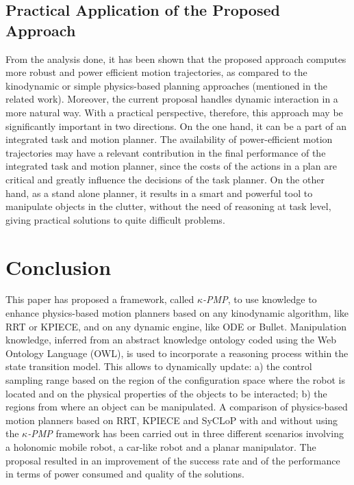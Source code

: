 \documentclass[twocolumn]{svjour3}          %
\begin{document}
\subsection{Practical Application of the Proposed Approach}
From the analysis done, it has been shown that the proposed approach computes more robust and power efficient motion trajectories, as compared to the kinodynamic or simple physics-based planning 
approaches (mentioned 
in the related work). Moreover, the current proposal handles dynamic interaction in a more natural way.  
With a practical perspective, therefore, this approach may be significantly important in two directions. On the one hand, it can be a part of an integrated task and motion planner. The availability of power-efficient motion trajectories may have a relevant contribution in the final performance of the integrated task and motion planner, since  the costs of the actions in a plan are critical and greatly influence  the decisions of the task planner. 
On the other hand, as a stand alone planner, it results in a smart and powerful tool to manipulate objects in the clutter, without the need of reasoning at task level, giving practical solutions to 
quite difficult problems.

\section{Conclusion}\label{s-conclusion}
This paper has proposed a framework, called \textit{$\kappa$-PMP}, to use knowledge to enhance physics-based motion planners based on any kinodynamic algorithm, like RRT or KPIECE, and on any dynamic 
engine, like ODE or Bullet.  Manipulation knowledge, inferred from an abstract knowledge ontology coded using the Web Ontology Language (OWL), is used to incorporate a reasoning process within the 
state transition model. This  allows to dynamically update: a) the control sampling range based on the region of the configuration space where the robot is located and on the physical properties of 
the objects to be interacted; b) the regions from where an object can be manipulated. A comparison of physics-based motion planners based on RRT, KPIECE and SyCLoP with and without using the 
\textit{$\kappa$-PMP} framework has been carried out in three different scenarios involving a holonomic mobile robot, a car-like robot and a planar manipulator. The proposal resulted in an improvement 
of the success rate and of the performance in terms of power consumed and quality of the solutions.

\balance

 \vspace{5mm}
\end{document}
